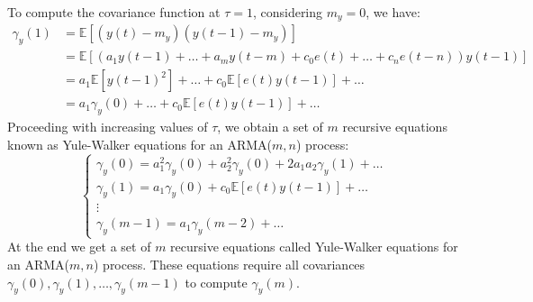 To compute the covariance function at $\tau=1$, considering $m_y=0$, we have:
\begin{align*}
    \gamma_y(1) &=\mathbb{E}\left[ \left(y(t)-m_y\right)\left(y(t-1)-m_y\right) \right] \\
                &=\mathbb{E}\left[ \left(a_1y(t-1)+\dots+a_my(t-m)+c_0e(t)+\dots+c_ne(t-n)\right)y(t-1) \right] \\
                &=a_1\mathbb{E}\left[y(t-1)^2\right]+\dots+c_0\mathbb{E}\left[e(t)y(t-1)\right]+\dots \\
                &=a_1\gamma_y(0)+\dots+c_0\mathbb{E}\left[e(t)y(t-1)\right]+\dots
\end{align*}
Proceeding with increasing values of $\tau$, we obtain a set of $m$ recursive equations known as Yule-Walker equations for an ARMA($m,n$) process:
\[\begin{cases}
    \gamma_y(0)=a_1^2\gamma_y(0) +a_2^2\gamma_y(0) +2a_1a_2\gamma_y(1) +\dots \\
    \gamma_y(1)=a_1\gamma_y(0) +c_0\mathbb{E}\left[e(t)y(t-1)\right] +\dots \\
    \vdots \\
    \gamma_y(m-1)=a_1\gamma_y(m-2)+\dots
\end{cases}\]
At the end we get a set of $m$ recursive equations called Yule-Walker equations for an ARMA($m,n$) process.
These equations require all covariances $\gamma_y(0),\gamma_y(1),\dots,\gamma_y(m-1)$ to compute $\gamma_y(m)$.